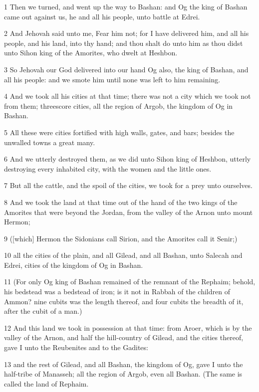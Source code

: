 \par 1 Then we turned, and went up the way to Bashan: and Og the king of Bashan came out against us, he and all his people, unto battle at Edrei.
\par 2 And Jehovah said unto me, Fear him not; for I have delivered him, and all his people, and his land, into thy hand; and thou shalt do unto him as thou didst unto Sihon king of the Amorites, who dwelt at Heshbon.
\par 3 So Jehovah our God delivered into our hand Og also, the king of Bashan, and all his people: and we smote him until none was left to him remaining.
\par 4 And we took all his cities at that time; there was not a city which we took not from them; threescore cities, all the region of Argob, the kingdom of Og in Bashan.
\par 5 All these were cities fortified with high walls, gates, and bars; besides the unwalled towns a great many.
\par 6 And we utterly destroyed them, as we did unto Sihon king of Heshbon, utterly destroying every inhabited city, with the women and the little ones.
\par 7 But all the cattle, and the spoil of the cities, we took for a prey unto ourselves.
\par 8 And we took the land at that time out of the hand of the two kings of the Amorites that were beyond the Jordan, from the valley of the Arnon unto mount Hermon;
\par 9 ([which] Hermon the Sidonians call Sirion, and the Amorites call it Senir;)
\par 10 all the cities of the plain, and all Gilead, and all Bashan, unto Salecah and Edrei, cities of the kingdom of Og in Bashan.
\par 11 (For only Og king of Bashan remained of the remnant of the Rephaim; behold, his bedstead was a bedstead of iron; is it not in Rabbah of the children of Ammon? nine cubits was the length thereof, and four cubits the breadth of it, after the cubit of a man.)
\par 12 And this land we took in possession at that time: from Aroer, which is by the valley of the Arnon, and half the hill-country of Gilead, and the cities thereof, gave I unto the Reubenites and to the Gadites:
\par 13 and the rest of Gilead, and all Bashan, the kingdom of Og, gave I unto the half-tribe of Manasseh; all the region of Argob, even all Bashan. (The same is called the land of Rephaim.
